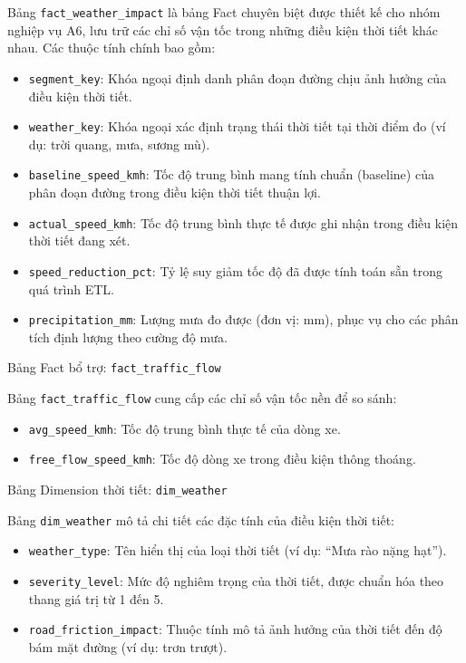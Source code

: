 Bảng \texttt{fact\_weather\_impact} là bảng Fact chuyên biệt được thiết kế cho nhóm nghiệp vụ A6, lưu trữ các chỉ số vận tốc trong những điều kiện thời tiết khác nhau. Các thuộc tính chính bao gồm:
\begin{itemize}
    \item \texttt{segment\_key}: Khóa ngoại định danh phân đoạn đường chịu ảnh hưởng của điều kiện thời tiết.
    \item \texttt{weather\_key}: Khóa ngoại xác định trạng thái thời tiết tại thời điểm đo (ví dụ: trời quang, mưa, sương mù).
    \item \texttt{baseline\_speed\_kmh}: Tốc độ trung bình mang tính chuẩn (baseline) của phân đoạn đường trong điều kiện thời tiết thuận lợi.
    \item \texttt{actual\_speed\_kmh}: Tốc độ trung bình thực tế được ghi nhận trong điều kiện thời tiết đang xét.
    \item \texttt{speed\_reduction\_pct}: Tỷ lệ suy giảm tốc độ đã được tính toán sẵn trong quá trình ETL.
    \item \texttt{precipitation\_mm}: Lượng mưa đo được (đơn vị: mm), phục vụ cho các phân tích định lượng theo cường độ mưa.
\end{itemize}

Bảng Fact bổ trợ: \texttt{fact\_traffic\_flow}

Bảng \texttt{fact\_traffic\_flow} cung cấp các chỉ số vận tốc nền để so sánh:
\begin{itemize}
    \item \texttt{avg\_speed\_kmh}: Tốc độ trung bình thực tế của dòng xe.
    \item \texttt{free\_flow\_speed\_kmh}: Tốc độ dòng xe trong điều kiện thông thoáng.
\end{itemize}

Bảng Dimension thời tiết: \texttt{dim\_weather}

Bảng \texttt{dim\_weather} mô tả chi tiết các đặc tính của điều kiện thời tiết:
\begin{itemize}
    \item \texttt{weather\_type}: Tên hiển thị của loại thời tiết (ví dụ: ``Mưa rào nặng hạt'').
    \item \texttt{severity\_level}: Mức độ nghiêm trọng của thời tiết, được chuẩn hóa theo thang giá trị từ 1 đến 5.
    \item \texttt{road\_friction\_impact}: Thuộc tính mô tả ảnh hưởng của thời tiết đến độ bám mặt đường (ví dụ: trơn trượt).
\end{itemize}

